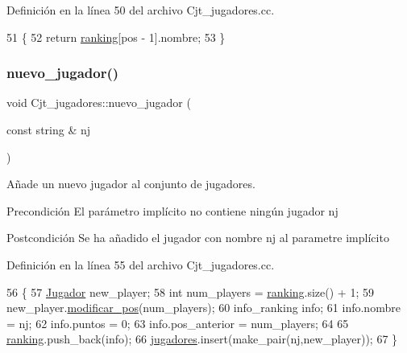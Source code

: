 Definición en la línea 50 del archivo Cjt\+\_\+jugadores.\+cc.


\begin{DoxyCode}
51 \{
52   \textcolor{keywordflow}{return} \hyperlink{class_cjt__jugadores_a2a64dd6a0c9315af038dfdb4c27da059}{ranking}[pos - 1].nombre;
53 \}
\end{DoxyCode}
\mbox{\label{class_cjt__jugadores_a23468af9b07a692a3036a1bf5a128232}} 
\subsubsection{\texorpdfstring{nuevo\+\_\+jugador()}{nuevo\_jugador()}}
{\footnotesize\ttfamily void Cjt\+\_\+jugadores\+::nuevo\+\_\+jugador (\begin{DoxyParamCaption}\item[{const string \&}]{nj }\end{DoxyParamCaption})}



Añade un nuevo jugador al conjunto de jugadores. 

\begin{DoxyPrecond}{Precondición}
El parámetro implícito no contiene ningún jugador nj 
\end{DoxyPrecond}
\begin{DoxyPostcond}{Postcondición}
Se ha añadido el jugador con nombre nj al parametre implícito 
\end{DoxyPostcond}


Definición en la línea 55 del archivo Cjt\+\_\+jugadores.\+cc.


\begin{DoxyCode}
56 \{
57   \hyperlink{class_jugador}{Jugador} new\_player;
58   \textcolor{keywordtype}{int} num\_players = \hyperlink{class_cjt__jugadores_a2a64dd6a0c9315af038dfdb4c27da059}{ranking}.size() + 1;
59   new\_player.\hyperlink{class_jugador_af77bc217af6013d9e57cab34dd03921c}{modificar\_pos}(num\_players);
60   info\_ranking info;
61   info.nombre = nj;
62   info.puntos = 0;
63   info.pos\_anterior = num\_players;
64 
65   \hyperlink{class_cjt__jugadores_a2a64dd6a0c9315af038dfdb4c27da059}{ranking}.push\_back(info);
66   \hyperlink{class_cjt__jugadores_ae3fc5f98e0f343b039bd7dff0e616ecc}{jugadores}.insert(make\_pair(nj,new\_player)); 
67 \}
\end{DoxyCode}
\mbox{\label{class_cjt__jugadores_ab0bba7a90bea0c07c219531985746bcb}} 

